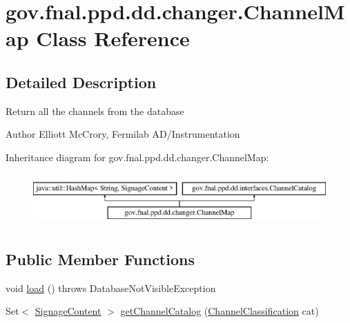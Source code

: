 \hypertarget{classgov_1_1fnal_1_1ppd_1_1dd_1_1changer_1_1ChannelMap}{\section{gov.\-fnal.\-ppd.\-dd.\-changer.\-Channel\-Map Class Reference}
\label{classgov_1_1fnal_1_1ppd_1_1dd_1_1changer_1_1ChannelMap}
}


\subsection{Detailed Description}
Return all the channels from the database

\begin{DoxyAuthor}{Author}
Elliott Mc\-Crory, Fermilab A\-D/\-Instrumentation 
\end{DoxyAuthor}
Inheritance diagram for gov.\-fnal.\-ppd.\-dd.\-changer.\-Channel\-Map\-:\begin{figure}[H]
\begin{center}
\leavevmode
\includegraphics[height=1.992882cm]{classgov_1_1fnal_1_1ppd_1_1dd_1_1changer_1_1ChannelMap}
\end{center}
\end{figure}
\subsection*{Public Member Functions}
\begin{DoxyCompactItemize}
\item 
void \hyperlink{classgov_1_1fnal_1_1ppd_1_1dd_1_1changer_1_1ChannelMap_a30c699e2eb86a310daa014e974c29bac}{load} ()  throws Database\-Not\-Visible\-Exception 
\item 
Set$<$ \hyperlink{interfacegov_1_1fnal_1_1ppd_1_1dd_1_1signage_1_1SignageContent}{Signage\-Content} $>$ \hyperlink{classgov_1_1fnal_1_1ppd_1_1dd_1_1changer_1_1ChannelMap_a34cad0dedd9b3ed3418a405d0c85ed27}{get\-Channel\-Catalog} (\hyperlink{classgov_1_1fnal_1_1ppd_1_1dd_1_1changer_1_1ChannelClassification}{Channel\-Classification} cat)
\end{DoxyCompactItemize}
